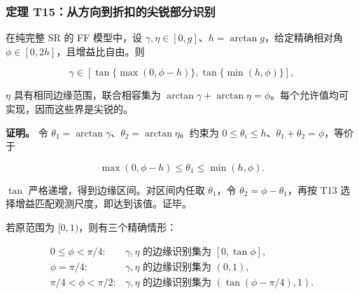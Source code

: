 \documentclass[11pt,a4paper]{article}
\begin{document}
\subsubsection{定理
T15：从方向到折扣的尖锐部分识别}\label{ux5b9aux7406-t15ux4eceux65b9ux5411ux5230ux6298ux6263ux7684ux5c16ux9510ux90e8ux5206ux8bc6ux522b}

\par
\noindent\begin{minipage}{\linewidth}

在纯完整 SR 的 FF 模型中，设
\(\gamma,\eta\in[0,g]\)、\(h=\arctan g\)，给定精确相对角
\(\phi\in[0,2h]\)，且增益比自由。则

\[
\gamma\in
\left[
\tan\{\max(0,\phi-h)\},
\tan\{\min(h,\phi)\}
\right],
\]

\end{minipage}\par

\(\eta\) 具有相同边缘范围，联合相容集为
\(\arctan\gamma+\arctan\eta=\phi\)。每个允许值均可实现，因而这些界是尖锐的。

\par
\noindent\begin{minipage}{\linewidth}

\textbf{证明。} 令
\(\theta_1=\arctan\gamma\)、\(\theta_2=\arctan\eta\)。约束为
\(0\le\theta_i\le h\)、\(\theta_1+\theta_2=\phi\)，等价于

\[
\max(0,\phi-h)\le\theta_1\le\min(h,\phi).
\]

\end{minipage}\par

\(\tan\) 严格递增，得到边缘区间。对区间内任取 \(\theta_1\)，令
\(\theta_2=\phi-\theta_1\)，再按 T13
选择增益匹配观测尺度，即达到该值。证毕。

\par
\noindent\begin{minipage}{\linewidth}

若原范围为 \([0,1)\)，则有三个精确情形：

\[
\begin{array}{ll}
0\le\phi<\pi/4:
&\gamma,\eta\text{ 的边缘识别集为 }[0,\tan\phi],\\
\phi=\pi/4:
&\gamma,\eta\text{ 的边缘识别集为 }(0,1),\\
\pi/4<\phi<\pi/2:
&\gamma,\eta\text{ 的边缘识别集为 }
(\tan(\phi-\pi/4),1).
\end{array}
\]

\end{minipage}\par
\end{document}
